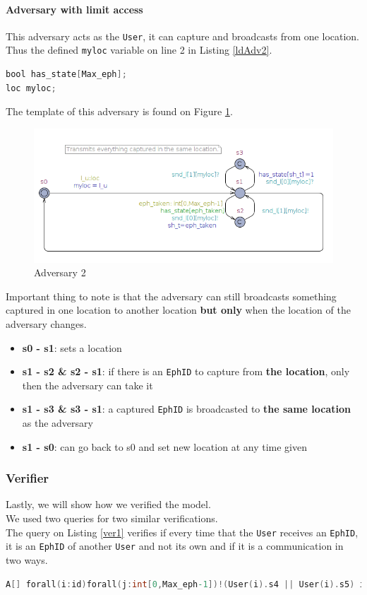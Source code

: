 \documentclass[a4paper, twocolumn]{article}
\begin{document}
\paragraph{Adversary with limit access}
This adversary acts as the \texttt{User}, it can capture and broadcasts from one location. Thus the defined \texttt{myloc} variable on line 2 in Listing \ref{ldAdv2}.
\begin{lstlisting}[language=C, caption= Adv2 Declarations,label={ldAdv2},xleftmargin=.02\textwidth]
bool has_state[Max_eph];
loc myloc;
\end{lstlisting}
The template of this adversary is found on Figure \ref{fig:adv2}.
\begin{figure}[H]
    \centering
    \includegraphics[scale=0.33]{images/adv2.png}
    \caption{Adversary 2}
    \label{fig:adv2} 
\end{figure}
\noindent Important thing to note is that the adversary can still broadcasts something captured in one location to another location \textbf{but only} when the location of the adversary changes.
\begin{itemize}
    \item \textbf{s0 - s1}: sets a location
    \item \textbf{s1 - s2 \& s2 - s1}: if there is an \texttt{EphID} to capture from \textbf{the location}, only then the adversary can take it
    \item \textbf{s1 - s3 \& s3 - s1}: a captured \texttt{EphID} is broadcasted to \textbf{the same location} as the adversary
    \item \textbf{s1 - s0}: can go back to s0 and set new location at any time given
\end{itemize}

\subsubsection{Verifier}\label{querry}
Lastly, we will show how we verified the model.\\
We used two queries for two similar verifications.\\
The query on Listing \ref{ver1} verifies if every time that the \texttt{User} receives an \texttt{EphID}, it is an \texttt{EphID} of another \texttt{User} and not its own and if it is a communication in two ways.
\begin{lstlisting}[language=C, caption= Weak Verifier,label={ver1}]
A[] forall(i:id)forall(j:int[0,Max_eph-1])!(User(i).s4 || User(i).s5) imply (User(i).r_token[j] imply exists(k:int[0,numEph-1])User(j/numEph+1).r_token[(i-1)*numEph+k])
\end{lstlisting}
\end{document}
